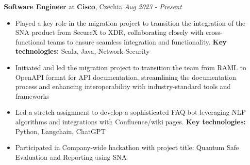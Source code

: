 
{\textbf{Software Engineer} at \textbf{Cisco}, Czechia}
    \hfill {\em Aug 2023 - Present}
    \begin{itemize}
        \item Played a key role in the migration project to transition the integration of the SNA product from SecureX to XDR, collaborating closely with cross-functional teams to ensure seamless integration and functionality. \textbf{Key technologies:} Scala, Java, Network Security
        \item Initiated and led the migration project to transition the team from RAML to OpenAPI format for API documentation, streamlining the documentation process and enhancing interoperability with industry-standard tools and frameworks
        \item Led a stretch assignment to develop a sophisticated FAQ bot leveraging NLP algorithms and integrations with Confluence/wiki pages. \textbf{Key technologies:} Python, Langchain, ChatGPT
        \item Participated in Company-wide hackathon with project title: Quantum Safe Evaluation and Reporting using SNA
    \end{itemize}

